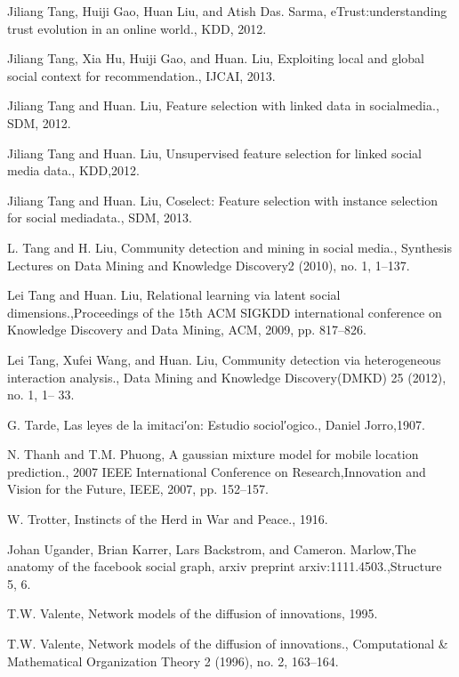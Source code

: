 \begin{thebibliography}{999}
 Jiliang Tang, Huiji Gao, Huan Liu, and Atish Das. Sarma, eTrust:understanding trust evolution in an online world., KDD, 2012.

 Jiliang Tang, Xia Hu, Huiji Gao, and Huan. Liu, Exploiting local and global social context for recommendation., IJCAI, 2013.

 Jiliang Tang and Huan. Liu, Feature selection with linked data in socialmedia., SDM, 2012.

 Jiliang Tang and Huan. Liu, Unsupervised feature selection for linked social media data., KDD,2012.

 Jiliang Tang and Huan. Liu, Coselect: Feature selection with instance selection for social mediadata., SDM, 2013.

 L. Tang and H. Liu, Community detection and mining in social media., Synthesis Lectures on Data Mining and Knowledge Discovery2 (2010), no. 1, 1–137.

 Lei Tang and Huan. Liu, Relational learning via latent social dimensions.,Proceedings of the 15th ACM SIGKDD international conference on Knowledge Discovery and Data Mining, ACM, 2009, pp. 817–826.

 Lei Tang, Xufei Wang, and Huan. Liu, Community detection via heterogeneous interaction analysis., Data Mining and Knowledge Discovery(DMKD) 25 (2012), no. 1, 1– 33.

 G. Tarde, Las leyes de la imitaci′on: Estudio sociol′ogico., Daniel Jorro,1907.

 N. Thanh and T.M. Phuong, A gaussian mixture model for mobile location prediction., 2007 IEEE International Conference on Research,Innovation and Vision for the Future, IEEE, 2007, pp. 152–157.

 W. Trotter, Instincts of the Herd in War and Peace., 1916.

 Johan Ugander, Brian Karrer, Lars Backstrom, and Cameron. Marlow,The anatomy of the facebook social graph, arxiv preprint arxiv:1111.4503.,Structure 5, 6.

 T.W. Valente, Network models of the diffusion of innovations, 1995.

 T.W. Valente, Network models of the diffusion of innovations., Computational \& Mathematical Organization Theory 2 (1996), no. 2, 163–164.


\end{thebibliography}
